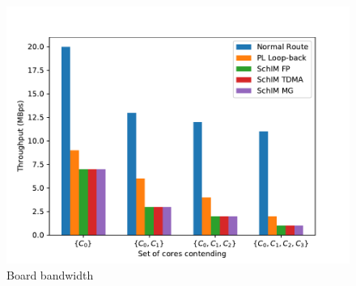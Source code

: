     \begin{figure}
      \centering
      \includegraphics[scale=0.5]{images/bw_comparisons.pdf}
      \caption{Board bandwidth}
      \label{fig:bandwidth_comparison}
    \end{figure}

